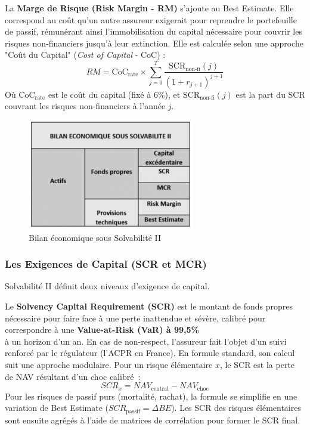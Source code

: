 \bigskip

La \textbf{Marge de Risque (Risk Margin - RM)} s'ajoute au Best Estimate. Elle correspond au coût qu'un autre assureur exigerait pour reprendre le portefeuille de passif, rémunérant ainsi l'immobilisation du capital nécessaire pour couvrir les risques non-financiers jusqu'à leur extinction. Elle est calculée selon une approche "Coût du Capital" (\textit{Cost of Capital} - CoC) :
\begin{equation}
    RM = \text{CoC}_{\text{rate}} \times \sum_{j=0}^{T} \frac{\text{SCR}_{\text{non-fi}}(j)}{(1+r_{j+1})^{j+1}}
\end{equation}
Où $\text{CoC}_{\text{rate}}$ est le coût du capital (fixé à 6\%), et $\text{SCR}_{\text{non-fi}}(j)$ est la part du SCR couvrant les risques non-financiers à l'année $j$.

\begin{figure}[H]
    \centering
    \includegraphics[width=0.65\textwidth]{images/2_chapitres/chapitre1/bilanS2.png}
    \caption{Bilan économique sous Solvabilité II}
    \label{fig:Bilan économique sous Solvabilité II}
\end{figure}


\subsubsection{Les Exigences de Capital (SCR et MCR)}

Solvabilité II définit deux niveaux d'exigence de capital.
\bigskip

Le \textbf{Solvency Capital Requirement (SCR)} est le montant de fonds propres nécessaire pour faire face à une perte inattendue et sévère, calibré pour correspondre à une \textbf{Value-at-Risk (VaR) à 99,5\%}\\ à un horizon d'un an. En cas de non-respect, l'assureur fait l'objet d'un suivi renforcé par le régulateur (l'ACPR en France). En formule standard, son calcul suit une approche modulaire. Pour un risque élémentaire $x$, le SCR est la perte de NAV résultant d'un choc calibré~:
\begin{equation}
    SCR_{x} = NAV_{\text{central}} - NAV_{\text{choc}}
\end{equation}
Pour les risques de passif purs (mortalité, rachat), la formule se simplifie en une variation de Best Estimate ($SCR_{\text{passif}} = \Delta BE$). Les SCR des risques élémentaires sont ensuite agrégés à l'aide de matrices de corrélation pour former le SCR final.

